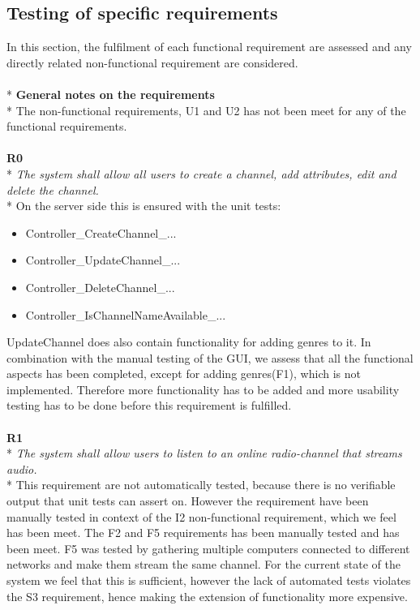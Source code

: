 \documentclass[a4paper,11pt,report]{article}
\begin{document}
{\subsection{Testing of specific requirements}
In this section, the fulfilment of each functional requirement are assessed and any directly related non-functional requirement are considered. \\ \\*
\textbf{General notes on the requirements} \\*
The non-functional requirements, U1 and U2 has not been meet for any of the functional requirements. \\ \\
\textbf{R0} \\*
\textit{The system shall allow all users to create a channel, add attributes, edit and delete the channel.} \\*
On the server side this is ensured with the unit tests:
\begin{itemize}
\item Controller\_CreateChannel\_...
\item Controller\_UpdateChannel\_...
\item Controller\_DeleteChannel\_...
\item Controller\_IsChannelNameAvailable\_...
\end{itemize}
UpdateChannel does also contain functionality for adding genres to it. In combination with the manual testing of the GUI, we assess that all the functional aspects has been completed, except for adding genres(F1), which is not implemented. Therefore more functionality has to be added and more usability testing has to be done before this requirement is fulfilled.\\ \\
\textbf{R1} \\*
\textit{The system shall allow users to listen to an online radio-channel that streams audio.} \\*
This requirement are not automatically tested, because there is no verifiable output that unit tests can assert on. However the requirement have been manually tested in context of the I2 non-functional requirement, which we feel has been meet. The F2 and F5 requirements has been manually tested and has been meet. F5 was tested by gathering multiple computers connected to different networks and make them stream the same channel. For the current state of the system we feel that this is sufficient, however the lack of automated tests violates the S3 requirement, hence making the extension of functionality more expensive. \\ \\
}
\end{document}
